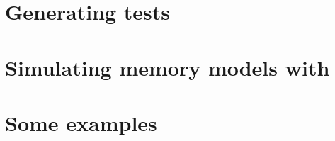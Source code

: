 \documentclass{article}
\begin{document}
\clearpage
\part{Generating\label{part:diy} tests}


\clearpage
\part{Simulating\label{part:herd} memory models with \herd}


%

\clearpage
\part{Some \label{part:examples} examples}


%




\end{document}

